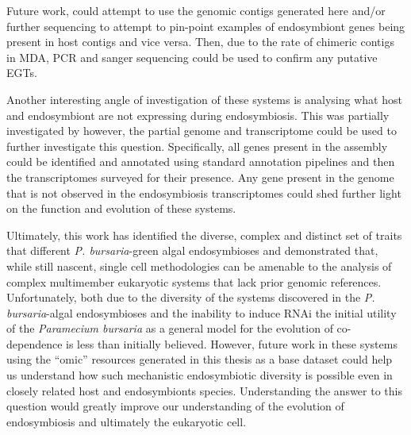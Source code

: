 Future work, could attempt to use the genomic contigs generated here
and/or further sequencing to attempt to pin-point examples of endosymbiont
genes being present in host contigs and vice versa. Then, due to the rate of 
chimeric contigs in MDA, PCR and sanger sequencing could be used to confirm
any putative EGTs.

Another interesting angle of investigation of these systems is
analysing what host and endosymbiont are not expressing during endosymbiosis.
This was partially investigated by \citep{Kodama2014} however, 
the partial genome and transcriptome could be used to further
investigate this question.  Specifically, all genes present in the assembly
could be identified and annotated using standard annotation pipelines
and then the transcriptomes surveyed for their presence.  Any gene
present in the genome that is not observed in the endosymbiosis
transcriptomes could shed further light on the function
and evolution of these systems.


Ultimately, this work has identified the diverse, complex and distinct set
of traits that different \textit{P. bursaria}-green algal endosymbioses
and demonstrated that, while still nascent, single cell methodologies
can be amenable to the analysis of complex multimember eukaryotic
systems that lack prior genomic references.  Unfortunately, both due to the
diversity of the systems discovered in the \textit{P. bursaria}-algal endosymbioses
and the inability to induce RNAi the initial 
utility of the \textit{Paramecium bursaria} as a general model for
the evolution of co-dependence is less than initially believed.  
However, future work in these systems using the ``omic'' resources generated in 
this thesis as a base dataset could help us understand how such mechanistic
endosymbiotic diversity is possible even in closely
related host and endosymbionts species. Understanding the answer to this
question would greatly improve our understanding of the evolution of endosymbiosis
and ultimately the eukaryotic cell.
